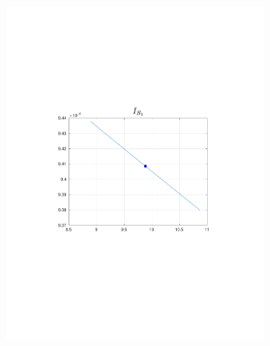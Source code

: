 \documentclass{beamer}
\begin{document}
\begin{frame}
\begin{columns}[t]
\begin{figure}
            \includegraphics[trim=4cm 4cm 4cm 8cm, clip=true, width=\linewidth]{img/InertiaActualComp}
        \end{figure}
        \begin{figure}
            \centering

\end{figure}
\end{columns}
\end{frame}
\end{document}
